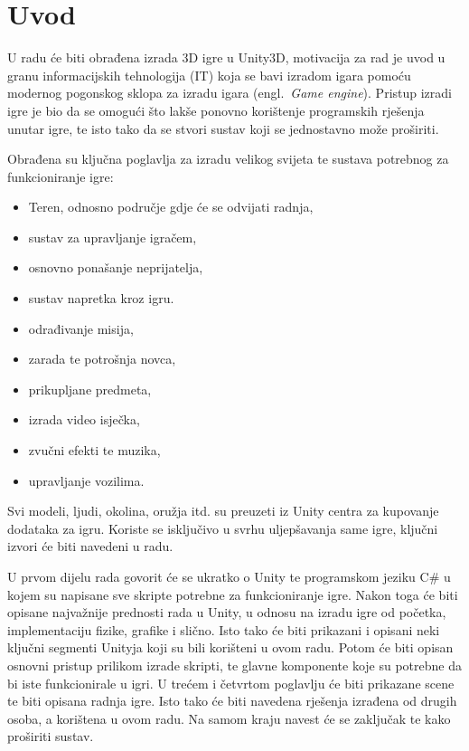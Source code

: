 \section{Uvod}
U radu će biti obrađena izrada 3D igre u Unity3D, motivacija za rad je uvod u granu informacijskih tehnologija (IT) koja se bavi izradom igara pomoću modernog pogonskog sklopa za izradu igara (engl.~\textit{Game engine}). Pristup izradi igre je bio da se omogući što lakše ponovno korištenje programskih rješenja unutar igre, te isto tako da se stvori sustav koji se jednostavno može proširiti.

Obrađena su ključna poglavlja za izradu velikog svijeta te sustava potrebnog za funkcioniranje igre:
\begin{itemize}
 \item Teren, odnosno područje gdje će se odvijati radnja,
 \item sustav za upravljanje igračem,
 \item osnovno ponašanje neprijatelja,
 \item sustav napretka kroz igru.
 \item odrađivanje misija,
 \item zarada te potrošnja novca,
 \item prikupljane predmeta,
 \item izrada video isječka,
 \item zvučni efekti te muzika,
 \item upravljanje vozilima.
\end{itemize}

Svi modeli, ljudi, okolina, oružja itd. su preuzeti iz Unity centra za kupovanje dodataka za igru. Koriste se isključivo u svrhu uljepšavanja same igre, ključni izvori će biti navedeni u radu. 

U prvom dijelu rada govorit će se ukratko o Unity te programskom jeziku C\# u kojem su napisane sve skripte potrebne za funkcioniranje igre. Nakon toga će biti opisane najvažnije prednosti rada u Unity, u odnosu na izradu igre od početka, implementaciju fizike, grafike i slično. Isto tako će biti prikazani i opisani neki ključni segmenti Unityja koji su bili korišteni u ovom radu. 
Potom će biti opisan osnovni pristup prilikom izrade skripti, te glavne komponente koje su potrebne da bi iste funkcionirale u igri. U trećem i četvrtom poglavlju će biti prikazane scene te biti opisana radnja igre. Isto tako će biti navedena rješenja izrađena od drugih osoba, a korištena u ovom radu.
Na samom kraju navest će se zaključak te kako proširiti sustav.


